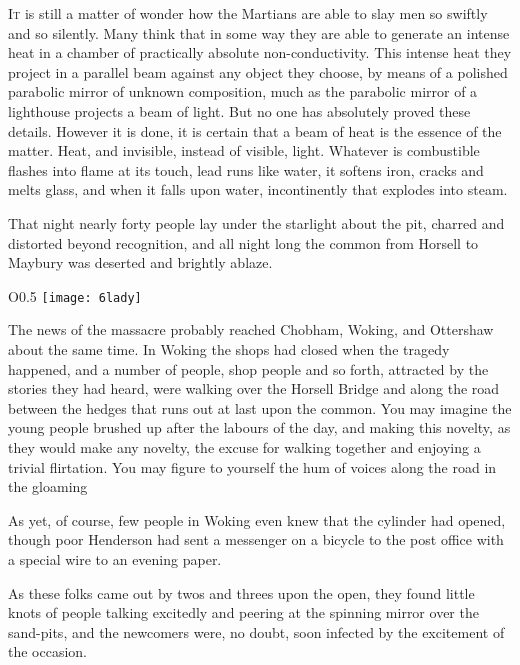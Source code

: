 


	\lettrine[lines=4]{I}{t} is still a matter of wonder how the Martians are able to slay men so swiftly and so silently. Many think that in some way they are able to generate an intense heat in a chamber of practically absolute non-conductivity. This intense heat they project in a parallel beam against any object they choose, by means of a polished parabolic mirror of unknown composition, much as the parabolic mirror of a lighthouse projects a beam of light. But no one has absolutely proved these details. However it is done, it is certain that a beam of heat is the essence of the matter. Heat, and invisible, instead of visible, light. Whatever is combustible flashes into flame at its touch, lead runs like water, it softens iron, cracks and melts glass, and when it falls upon water, incontinently that explodes into steam.

That night nearly forty people lay under the starlight about the pit, charred and distorted beyond recognition, and all night long the common from Horsell to Maybury was deserted and brightly ablaze.

\begin{wrapfigure}{O}{0.5\textwidth}
\centering
\texttt{[image: 6lady]}
\end{wrapfigure}

The news of the massacre probably reached Chobham, Woking, and Ottershaw about the same time. In Woking the shops had closed when the tragedy happened, and a number of people, shop people and so forth, attracted by the stories they had heard, were walking over the Horsell Bridge and along the road between the hedges that runs out at last upon the common. You may imagine the young people brushed up after the labours of the day, and making this novelty, as they would make any novelty, the excuse for walking together and enjoying a trivial flirtation. You may figure to yourself the hum of voices along the road in the gloaming\textellipsis

As yet, of course, few people in Woking even knew that the cylinder had opened, though poor Henderson had sent a messenger on a bicycle to the post office with a special wire to an evening paper.

As these folks came out by twos and threes upon the open, they found little knots of people talking excitedly and peering at the spinning mirror over the sand-pits, and the newcomers were, no doubt, soon infected by the excitement of the occasion.


